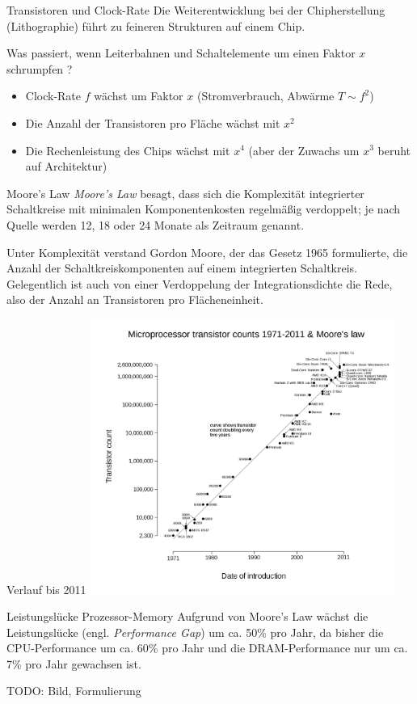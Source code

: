 \begin{bonus}{Transistoren und Clock-Rate}
    Die Weiterentwicklung bei der Chipherstellung (Lithographie) führt zu feineren Strukturen auf einem Chip.

    Was passiert, wenn Leiterbahnen und Schaltelemente um einen Faktor $x$ schrumpfen ?
    \begin{itemize}
        \item Clock-Rate $f$ wächst um Faktor $x$ (Stromverbrauch, Abwärme $T \sim f^2$)
        \item Die Anzahl der Transistoren pro Fläche wächst mit $x^2$
        \item Die Rechenleistung des Chips wächst mit $x^4$ (aber der Zuwachs um $x^3$ beruht auf Architektur)
    \end{itemize}
\end{bonus}

\begin{defi}{Moore's Law}
    \emph{Moore's Law} besagt, dass sich die Komplexität integrierter Schaltkreise mit minimalen Komponentenkosten regelmäßig verdoppelt; je nach Quelle werden 12, 18 oder 24 Monate als Zeitraum genannt.

    Unter Komplexität verstand Gordon Moore, der das Gesetz 1965 formulierte, die Anzahl der Schaltkreiskomponenten auf einem integrierten Schaltkreis. Gelegentlich ist auch von einer Verdoppelung der Integrationsdichte die Rede, also der Anzahl an Transistoren pro Flächeneinheit.
\end{defi}

\begin{bonus}{Verlauf bis 2011}
    \centering
    \includegraphics[width=0.75\textwidth]{images/moores_law.png}
\end{bonus}

\begin{bonus}{Leistungslücke Prozessor-Memory}
    Aufgrund von Moore's Law wächst die Leistungslücke (engl. \emph{Performance Gap}) um ca. 50\% pro Jahr, da bisher die CPU-Performance um ca. 60\% pro Jahr und die DRAM-Performance nur um ca. 7\% pro Jahr gewachsen ist.

    TODO: Bild, Formulierung
\end{bonus}

